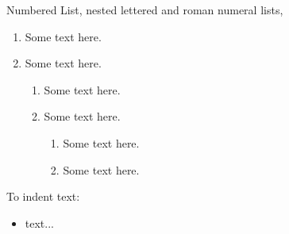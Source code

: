 Numbered List, nested lettered and roman numeral lists,

\begin{enumerate}

\item Some text here. 

\item Some text here. 

\begin{enumerate}
\item Some text here. 

\item Some text here. 

\begin{enumerate}
\item
Some text here. 

\item
Some text here. 
\end{enumerate}
\end{enumerate}
\end{enumerate}


To indent text:
\begin{itemize}
\item[] 
text...
\end{itemize}

